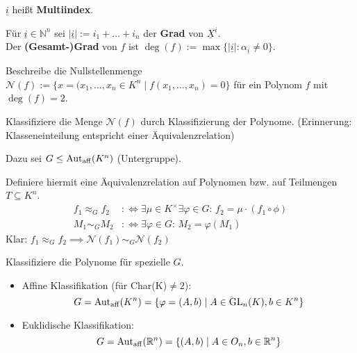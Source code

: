 \documentclass[parskip,a4paper,twoside,DIV15,BCOR12mm]{scrbook}
\begin{document}
\(\underline{i}\) heißt \textbf{Multiindex}.
\begin{definition}
Für \(\underline{i}\in\mathbb{N}^{n}\) sei \(|\underline{i}|:=i_{1}+\ldots+i_{n}\) der \textbf{Grad} von \(\underline{X}^{\underline{i}}\).\\
Der \textbf{(Gesamt-)Grad} von \(f\) ist \(\deg(f):=\max\{|\underline{i}|:\alpha_{\underline{i}}\neq0\}\).
\end{definition}

\begin{ziel}
Beschreibe die Nullstellenmenge
\(\mathcal{N}(f):=\{x=(x_{1},\dots,x_{n}\in K^{n}\mid f(x_{1},\dots,x_{n})=0\}\)
für ein Polynom \(f\) mit \(\deg(f)=2\).
\end{ziel} 

\begin{comment}
Den Fall eines oder mehrerer Polynome vom Grad 1 erledigt die lineare Algebra.
Mehrere Polynome vom Grad \(\geq 2\) behandelt die \textbf{Kommutative Algebra 
und algebraische Geometrie}.
\end{comment}

\begin{prepwork}
Klassifiziere die Menge \(\mathcal{N}(f)\) durch
Klassifizierung der Polynome. (Erinnerung: Klasseneinteilung entspricht einer
Äquivalenzrelation)

Dazu sei \(G\leq\operatorname{Aut_{aff}}(K^{n})\) (Untergruppe).

Definiere hiermit eine Äquivalenzrelation auf Polynomen bzw. auf Teilmengen
\(T\subseteq K^{n}\).
\begin{align*}
f_{1}\approx_{G}f_{2}&:\Longleftrightarrow\exists\mu\in K^{\times}\exists\varphi
\in G:\,f_{2}=\mu\cdot (f_{1}\circ\phi)\\
M_{1}\sim_{G}M_{2}&:\Longleftrightarrow\exists\varphi\in G:\,M_{2}=\varphi(M_{1})
\end{align*}
Klar: \(f_{1}\approx_{G}f_{2}\implies\mathcal{N}(f_{1})\sim_{G}\mathcal{N}(f_{2})\)
\end{prepwork}

\begin{ziel}
Klassifiziere die Polynome für spezielle \(G\).
\begin{itemize}
\item Affine Klassifikation (für Char(K)\(\neq 2\)): 
\[
G=\operatorname{Aut_{aff}}(K^{n})=\{\varphi=(A,b)\mid A\in\operatorname{GL}_{n}(K),b\in K^{n}\}
\]
\item Euklidische Klassifikation: 
\[
G=\operatorname{Aut_{aff}}(\mathbb{R}^{n})=\{(A,b)\mid A\in O_{n},b\in\mathbb{R}^{n}\}
\]
\end{itemize}
\end{ziel}
\end{document}

